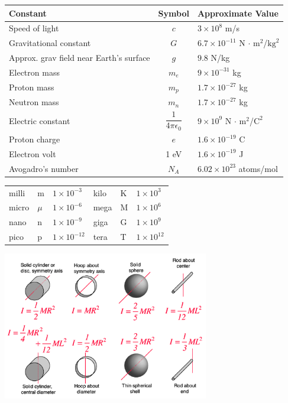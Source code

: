 \begin{tabular}{lcl}
	Constant & Symbol & Approximate Value \\ \hline
	Speed of light & $c$ & $3 \times 10^8$ m/s \\
	Gravitational constant & $G$ & $6.7 \times 10^{-11}$ N $\cdot \text{ m}^2$/$\text{kg}^2$\\
	Approx. grav field near Earth's surface & $g$ & $9.8$ N/kg\\
	Electron mass & $m_e$ & $9 \times 10^{-31}$ kg \\
	Proton mass & $m_p$ & $1.7 \times 10^{-27}$ kg \\
	Neutron mass & $m_n$ & $1.7 \times 10^{-27}$ kg \\
	Electric constant & $\dfrac{1}{4 \pi \epsilon_0}$ & $9 \times 10^9$ N $\cdot \text{ m}^2$/$\text{C}^2$\\
	Proton charge & $e$ & $1.6 \times 10^{-19}$ C \\
	Electron volt & 1 eV & $1.6 \times 10^{-19}$ J \\
	Avogadro's number & $N_A$ & $6.02 \times 10^{23}$ atoms/mol \\
	\hline
\end{tabular}

\vspace{.2in}
\begin{tabular} {lll|lll}
	milli & m & $1 \times 10^{-3}$ \hspace*{0.5in} & \hspace{0.5in} kilo & K & $1 \times 10^{3}$\\
	micro & $\mu$ & $1 \times 10^{-6}$ &  \hspace{0.5in} mega & M & $1 \times 10^{6}$\\
	nano & n &$1 \times 10^{-9}$ &  \hspace{0.5in} giga & G & $1 \times 10^{9}$\\
	pico & p & $1 \times 10^{-12}$ &  \hspace{0.5in} tera & T & $1 \times 10^{12}$ \\
\end{tabular}


\begin{center}
	\includegraphics[width=9cm]{moments_of_inertia.png}
\end{center}